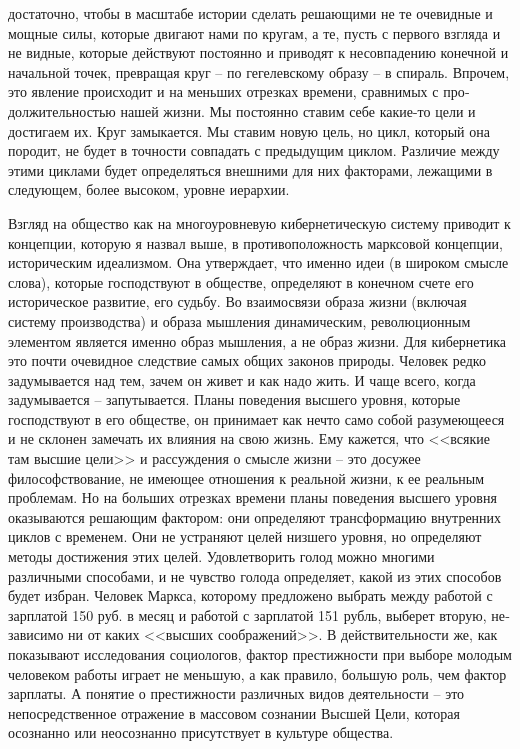 \documentclass{book}
\begin{document}
достаточно, чтобы в масштабе истории сделать решающими не те очевидные и мощные силы, которые двигают нами по кругам, а те, пусть с первого взгляда и не видные, которые действуют постоянно и приводят к несовпадению конечной и начальной точек, превращая круг -- по гегелевскому образу -- в спираль. Впрочем, это явление происходит и на меньших отрезках времени, сравнимых с про­должительностью нашей жизни. Мы постоянно ставим себе ка­кие-то цели и достигаем их. Круг замыкается. Мы ставим новую цель, но цикл, который она породит, не будет в точности сов­падать с предыдущим циклом. Различие между этими циклами будет определяться внешними для них факторами, лежащими в следующем, более высоком, уровне иерархии.

Взгляд на общество как на многоуровневую кибернетиче­скую систему приводит к концепции, которую я назвал выше, в противоположность марксовой концепции, историческим идеализмом.  Она утверждает, что именно идеи  (в широком смысле слова), которые господствуют в обществе, определяют в конечном счете его историческое развитие, его судьбу. Во взаимосвязи образа жизни (включая систему производства) и образа мышления динамическим, революционным элемен­том является именно образ мышления, а не образ жизни. Для кибернетика это почти очевидное следствие самых общих зако­нов природы. Человек редко задумывается над тем, зачем он живет и как надо жить. И чаще всего, когда задумывается -- запутывается. Планы поведения высшего уровня, которые господствуют в его обществе, он принимает как нечто само собой разумеющееся и не склонен замечать их влияния на свою жизнь. Ему кажется, что <<всякие там высшие цели>> и рассуж­дения о смысле жизни -- это досужее философствование, не имеющее отношения к реальной жизни, к ее реальным 
пробле­мам. Но на больших отрезках времени планы поведения выс­шего уровня оказываются решающим фактором: они опреде­ляют трансформацию внутренних циклов с временем. Они не устраняют целей низшего уровня, но определяют методы до­стижения этих целей. Удовлетворить голод можно многими различными способами, и не  чувство голода определяет, ка­кой из этих способов будет избран. Человек Маркса, которо­му предложено выбрать между работой с зарплатой 150 руб. в месяц и работой с зарплатой 151 рубль, выберет вторую, не­зависимо ни от каких <<высших соображений>>. В действительности же, как показывают исследования социологов, фактор престижности при выборе молодым человеком работы играет не меньшую, а как правило, большую роль, чем фактор зарплаты. А понятие о престижности различных видов деятель­ности -- это непосредственное отражение в массовом сознании Высшей Цели, которая осознанно или неосознанно присутствует в культуре общества.
\end{document}
